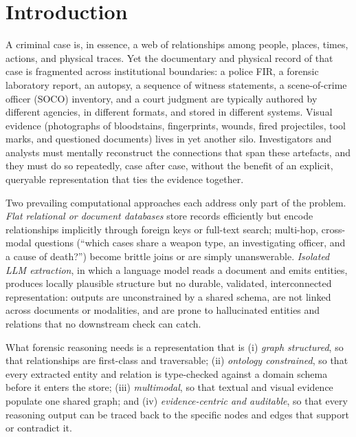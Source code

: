 \documentclass[conference]{IEEEtran}
\begin{document}
\section{Introduction}
\label{sec:intro}

A criminal case is, in essence, a web of relationships among people, places,
times, actions, and physical traces. Yet the documentary and physical record of
that case is fragmented across institutional boundaries: a police FIR, a
forensic laboratory report, an autopsy, a sequence of witness statements, a
scene-of-crime officer (SOCO) inventory, and a court judgment are typically
authored by different agencies, in different formats, and stored in different
systems. Visual evidence (photographs of bloodstains, fingerprints, wounds,
fired projectiles, tool marks, and questioned documents) lives in yet another
silo. Investigators and analysts must mentally reconstruct the connections that
span these artefacts, and they must do so repeatedly, case after case, without
the benefit of an explicit, queryable representation that ties the evidence
together.

Two prevailing computational approaches each address only part of the problem.
\emph{Flat relational or document databases} store records efficiently but encode
relationships implicitly through foreign keys or full-text search; multi-hop,
cross-modal questions (``which cases share a weapon type, an investigating
officer, and a cause of death?'') become brittle joins or are simply
unanswerable. \emph{Isolated LLM extraction}, in which a language model reads a
document and emits entities, produces locally plausible structure but no durable,
validated, interconnected representation: outputs are unconstrained by a shared
schema, are not linked across documents or modalities, and are prone to
hallucinated entities and relations that no downstream check can catch.

What forensic reasoning needs is a representation that is (i) \emph{graph
structured}, so that relationships are first-class and traversable; (ii)
\emph{ontology constrained}, so that every extracted entity and relation is
type-checked against a domain schema before it enters the store; (iii)
\emph{multimodal}, so that textual and visual evidence populate one shared graph;
and (iv) \emph{evidence-centric and auditable}, so that every reasoning output
can be traced back to the specific nodes and edges that support or contradict it.
\end{document}
